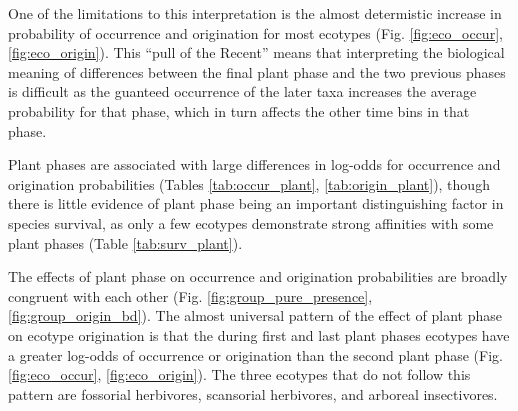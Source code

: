 One of the limitations to this interpretation is the almost determistic increase in probability of occurrence and origination for most ecotypes (Fig. \ref{fig:eco_occur}, \ref{fig:eco_origin}). This ``pull of the Recent'' means that interpreting the biological meaning of differences between the final plant phase and the two previous phases is difficult as the guanteed occurrence of the later taxa increases the average probability for that phase, which in turn affects the other time bins in that phase.

Plant phases are associated with large differences in log-odds for occurrence and origination probabilities (Tables \ref{tab:occur_plant}, \ref{tab:origin_plant}), though there is little evidence of plant phase being an important distinguishing factor in species survival, as only a few ecotypes demonstrate strong affinities with some plant phases (Table \ref{tab:surv_plant}). 

The effects of plant phase on occurrence and origination probabilities are broadly congruent with each other (Fig. \ref{fig:group_pure_presence}, \ref{fig:group_origin_bd}). The almost universal pattern of the effect of plant phase on ecotype origination is that the during first and last plant phases ecotypes have a greater log-odds of occurrence or origination than the second plant phase (Fig. \ref{fig:eco_occur}, \ref{fig:eco_origin}). The three ecotypes that do not follow this pattern are fossorial herbivores, scansorial herbivores, and arboreal insectivores.



